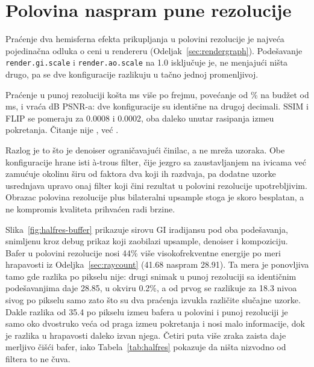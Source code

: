 \section{Polovina naspram pune rezolucije}
\label{sec:halfres}

Pra\'cenje dva hemisferna efekta prikupljanja u polovini rezolucije je najve\'ca pojedina\v{c}na odluka o ceni u
rendereru (Odeljak~\ref{sec:rendergraph}). Pode\v{s}avanje \texttt{render.gi.scale} i \texttt{render.ao.scale} na 1.0 isklju\v{c}uje je, ne menjaju\'ci ni\v{s}ta drugo, pa
se dve konfiguracije razlikuju u ta\v{c}no jednoj promenljivoj.

\begin{table}[tbp]
\caption[Pra\'cenje u polovini naspram pune rezolucije]{Polovina naspram pune rezolucije za GI i AO pra\'cenje (RX 9070 XT). Vreme je ukupno GPU vreme
konfiguracije \texttt{+gi}, a kvalitet je meren sa gledi\v{s}ta atrijuma naspram
konvergirane path-traced reference.}
\label{tab:halfres}
\centering

\end{table}

Pra\'cenje u punoj rezoluciji ko\v{s}ta \hrDeltaMs{} ms vi\v{s}e po frejmu, pove\'canje od \hrDeltaPct\% na
bud\v{z}et od \hrHalfTotal{} ms, i vra\'ca \hrPsnrGain{} dB PSNR-a: dve konfiguracije su identi\v{c}ne
na drugoj decimali. SSIM i FLIP se pomeraju za 0.0008 i 0.0002, oba daleko unutar rasipanja
izme\dj{}u pokretanja. \v{C}itanje nije , ve\'c .

Razlog je to \v{s}to je denoiser ograni\v{c}avaju\'ci \v{c}inilac, a ne mre\v{z}a uzoraka. Obe konfiguracije
hrane isti à-trous filter, \v{c}ije jezgro sa zaustavljanjem na ivicama ve\'c zamu\'cuje okolinu \v{s}iru od
faktora dva koji ih razdvaja, pa dodatne uzorke usrednjava upravo onaj filter koji \v{c}ini rezultat u
polovini rezolucije upotrebljivim. Obrazac polovina rezolucije plus bilateralni upsample stoga je
skoro besplatan, a ne kompromis kvaliteta prihva\'cen radi brzine.

Slika~\ref{fig:halfres-buffer} prikazuje sirovu GI iradijansu pod oba pode\v{s}avanja, snimljenu kroz
debug prikaz koji zaobilazi upsample, denoiser i kompoziciju. Bafer u polovini rezolucije nosi
44\% vi\v{s}e visokofrekventne energije po meri hrapavosti iz Odeljka~\ref{sec:raycount} (41.68
naspram 28.91). Ta mera je ponovljiva tamo gde razlika po pikselu nije: drugi
snimak u punoj rezoluciji sa identi\v{c}nim pode\v{s}avanjima daje 28.85, u okviru 0.2\%, a od
prvog se razlikuje za 18.3 nivoa sivog po pikselu samo zato \v{s}to su dva pra\'cenja izvukla razli\v{c}ite slu\v{c}ajne uzorke. Dakle
razlika od 35.4 po pikselu izme\dj{}u bafera u polovini i punoj rezoluciji je samo oko dvostruko ve\'ca od
praga izme\dj{}u pokretanja i nosi malo informacije, dok je razlika u hrapavosti daleko izvan njega. \v{C}etiri
puta vi\v{s}e zraka zaista daje merljivo \v{c}i\v{s}\'ci bafer, iako Tabela~\ref{tab:halfres} pokazuje da
ni\v{s}ta nizvodno od filtera to ne \v{c}uva.

